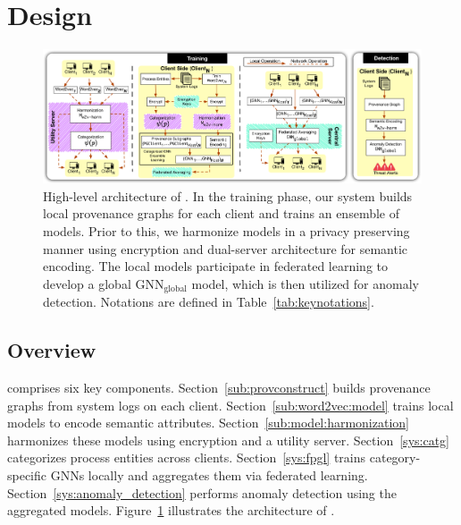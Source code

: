 \section{Design}
\label{sec:methodology}




\begin{figure}[t!]
  \centering
  \includegraphics[width=1\textwidth]{fig/archv7.pdf}
  \caption{High-level architecture of \Sys. In the training phase, our system builds local provenance graphs for each client and trains an ensemble of \gnnshort models. Prior to this, we harmonize \wordvec models in a privacy preserving manner using encryption and dual-server architecture for semantic encoding. The local \gnnshort models participate in federated learning to develop a global \( {\text{GNN}}_{\text{global}} \) model, which is then utilized for anomaly detection. Notations are defined in Table~\ref{tab:keynotations}.}
  \vspace{-3ex}
  \label{fig:arch}
\end{figure}


\subsection{Overview}
\Sys comprises six key components. Section~\ref{sub:provconstruct} builds provenance graphs from system logs on each client. Section~\ref{sub:word2vec:model} trains local \wordvec models to encode semantic attributes. Section~\ref{sub:model:harmonization} harmonizes these models using encryption and a utility server. Section~\ref{sys:catg} categorizes process entities across clients. Section~\ref{sys:fpgl} trains category-specific GNNs locally and aggregates them via federated learning. Section~\ref{sys:anomaly_detection} performs anomaly detection using the aggregated models. Figure~\ref{fig:arch} illustrates the architecture of \Sys.

